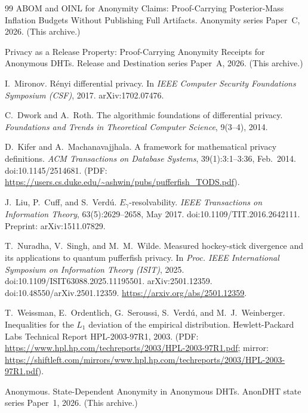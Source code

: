 \documentclass[11pt]{article}
\theoremstyle{definition}
\theoremstyle{remark}
\begin{document}
\begin{thebibliography}{99}
ABOM and OINL for Anonymity Claims: Proof-Carrying Posterior-Mass Inflation Budgets Without Publishing Full Artifacts.
\newblock Anonymity series Paper~C, 2026. (This archive.)

Privacy as a Release Property: Proof-Carrying Anonymity Receipts for Anonymous DHTs.
\newblock Release and Destination series Paper~A, 2026. (This archive.)


I.~Mironov.
\newblock R\'enyi differential privacy.
\newblock In \emph{IEEE Computer Security Foundations Symposium (CSF)}, 2017. arXiv:1702.07476.

C.~Dwork and A.~Roth.
\newblock The algorithmic foundations of differential privacy.
\newblock \emph{Foundations and Trends in Theoretical Computer Science}, 9(3--4), 2014.

D.~Kifer and A.~Machanavajjhala.
\newblock A framework for mathematical privacy definitions.
\newblock \emph{ACM Transactions on Database Systems}, 39(1):3:1--3:36, Feb.\ 2014.
\newblock doi:10.1145/2514681. (PDF: \url{https://users.cs.duke.edu/~ashwin/pubs/pufferfish_TODS.pdf}).

J.~Liu, P.~Cuff, and S.~Verd\'u.
\newblock $E_\gamma$-resolvability.
\newblock \emph{IEEE Transactions on Information Theory}, 63(5):2629--2658, May 2017.
\newblock doi:10.1109/TIT.2016.2642111. Preprint: arXiv:1511.07829.

T.~Nuradha, V.~Singh, and M.~M.~Wilde.
\newblock Measured hockey-stick divergence and its applications to quantum pufferfish privacy.
\newblock In \emph{Proc. IEEE International Symposium on Information Theory (ISIT)}, 2025.
\newblock doi:10.1109/ISIT63088.2025.11195501. arXiv:2501.12359. doi:10.48550/arXiv.2501.12359.
\newblock \url{https://arxiv.org/abs/2501.12359}.

T.~Weissman, E.~Ordentlich, G.~Seroussi, S.~Verd\'u, and M.~J.~Weinberger.
\newblock Inequalities for the $L_1$ deviation of the empirical distribution.
\newblock Hewlett-Packard Labs Technical Report HPL-2003-97R1, 2003.
\newblock (PDF: \url{https://www.hpl.hp.com/techreports/2003/HPL-2003-97R1.pdf}; mirror: \url{https://shiftleft.com/mirrors/www.hpl.hp.com/techreports/2003/HPL-2003-97R1.pdf}).




Anonymous.
\newblock State-Dependent Anonymity in Anonymous DHTs.
\newblock AnonDHT state series Paper~1, 2026. (This archive.)


\end{thebibliography}
\end{document}
